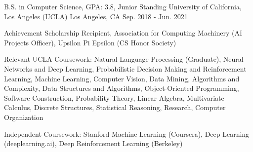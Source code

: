 

\begin{cventries}

  \cventry
    {B.S. in Computer Science, GPA: 3.8, Junior Standing} %
    {University of California, Los Angeles (UCLA)} %
    {Los Angeles, CA} %
    {Sep. 2018 - Jun. 2021} %
    {
      \begin{cvitems} %
        \item {Achievement Scholarship Recipient, Association for Computing Machinery
        (AI Projects Officer), Upsilon Pi Epsilon (CS Honor Society)}
        \item {Relevant UCLA Coursework: Natural Language Processing (Graduate),
        Neural Networks and Deep Learning, Probabilistic Decision Making and Reinforcement 
        Learning, Machine Learning, Computer Vision, Data Mining,
        Algorithms and Complexity, Data Structures and Algorithms, Object-Oriented 
        Programming, Software Construction, Probability Theory, Linear Algebra, 
        Multivariate Calculus, Discrete Structures, Statistical Reasoning, 
        Research, Computer Organization}
        \item {Independent Coursework: Stanford Machine Learning (Coursera), Deep Learning (deeplearning.ai), Deep Reinforcement Learning (Berkeley)}
      \end{cvitems}
    }

\end{cventries}
